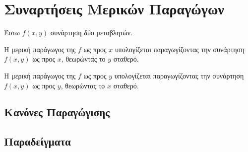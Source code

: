 \section{Συναρτήσεις Μερικών Παραγώγων}

Έστω $ f(x,y) $ συνάρτηση δύο μεταβλητών. 
\begin{myitemize}
  \item Η μερική παράγωγος της $f$ ως προς $x$ υπολογίζεται παραγωγίζοντας 
    την συνάρτηση $ f(x,y) $ ως προς $x$, θεωρώντας το $y$ σταθερό. 
  \item Η μερική παράγωγος της $f$ ως προς $y$ υπολογίζεται παραγωγίζοντας 
    την συνάρτηση $ f(x,y) $ ως προς $y$, θεωρώντας το $x$ σταθερό. 
\end{myitemize}

\subsection{Κανόνες Παραγώγισης}


\subsection*{Παραδείγματα}

